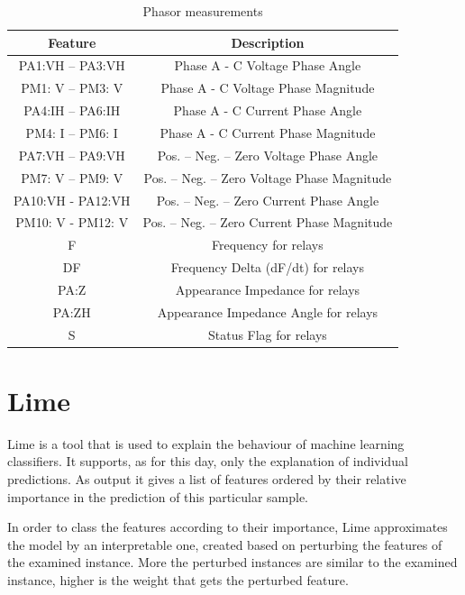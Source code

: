\begin{table}[H]
    \centering
    \caption[Phasor measurements]{Phasor measurements \cite{adhikari_power_2014}} \label{tab:pmu_mes}
    \begin{tabular}{|c|c|}\hline
        \textbf{Feature}&\textbf{Description} \\\hline
        PA1:VH – PA3:VH&Phase A - C Voltage Phase Angle \\\hline
        PM1: V – PM3: V&Phase A - C Voltage Phase Magnitude \\\hline
        PA4:IH – PA6:IH&Phase A - C Current Phase Angle \\\hline
        PM4: I – PM6: I&Phase A - C Current Phase Magnitude \\\hline
        PA7:VH – PA9:VH&Pos. – Neg. – Zero Voltage Phase Angle \\\hline
        PM7: V – PM9: V&Pos. – Neg. – Zero Voltage Phase Magnitude \\\hline
        PA10:VH - PA12:VH&Pos. – Neg. – Zero Current Phase Angle \\\hline
        PM10: V - PM12: V&Pos. – Neg. – Zero Current Phase Magnitude \\\hline
        F&Frequency for relays \\\hline
        DF&Frequency Delta (dF/dt) for relays \\\hline
        PA:Z&Appearance Impedance for relays \\\hline
        PA:ZH&Appearance Impedance Angle for relays \\\hline
        S&Status Flag for relays \\\hline
    \end{tabular}
\end{table}

\section{Lime}
Lime is a tool that is used to explain the behaviour of machine learning classifiers. It supports, as for this day, only the explanation of individual predictions. As output it gives a list of features ordered by their relative importance in the prediction of this particular sample.

In order to class the features according to their importance, Lime approximates the model by an interpretable one, created based on perturbing the features of the examined instance. More the perturbed instances are similar to the examined instance, higher is the weight that gets the perturbed feature.

